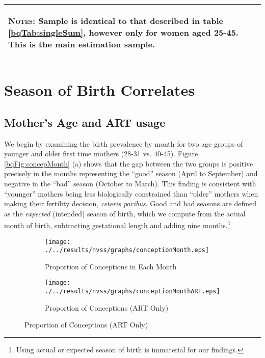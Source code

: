 \documentclass[a4paper, 12 pt]{article}
\theoremstyle{plain}
\begin{document}
\begin{doublespace}
\begin{table}[htpb!]
\begin{center}
\begin{tabular}{lccccc}
\midrule\multicolumn{6}{p{14.2cm}}{\begin{footnotesize}\textsc{Notes:} Sample is identical to that described in table \ref{bqTab:singleSum}, however only for women aged 25-45.  This  is the main estimation sample.                                    \end{footnotesize}} \\ \bottomrule
 \end{tabular}\end{center}\end{table}



\newpage
\section{Season of Birth Correlates}
\label{scn:results}
\subsection{Mother's Age and ART usage}
We begin by examining the birth prevalence by month for two age groups of younger and older first time mothers (28-31 vs. 40-45). Figure \ref{bqFig:concepMonth} (a) shows that the gap between the two groups is positive precisely in the months representing the ``good'' season (April to September) and negative in the ``bad'' season (October to March). This finding is consistent with ``younger'' mothers being less biologically constrained than ``older'' mothers when making their fertility decision, \emph{ceteris paribus}. Good and bad seasons are defined as the \emph{expected} (intended) season of birth, which we compute from the actual month of birth, subtracting gestational length and adding nine months.\footnote{ Using actual or expected season of birth is immaterial for our findings.}

\begin{figure}[htpb!]
\begin{center}
\caption{Birth Prevalence by Month, Age Group, and ART Usage}
\label{bqFig:concepMonth}
\begin{subfigure}{.5\textwidth}
  \centering
  \texttt{[image: ./../results/nvss/graphs/conceptionMonth.eps]}
  \caption{Proportion of Conceptions in Each Month}
  \label{fig:concepAbs}
\end{subfigure}%
\begin{subfigure}{.5\textwidth}
  \centering
  \texttt{[image: ./../results/nvss/graphs/conceptionMonthART.eps]}
  \caption{Proportion of Conceptions (ART Only)}
  \label{fig:concepAbsART}
\end{subfigure}
\end{center}
\end{figure}


\end{doublespace}
\end{document}
